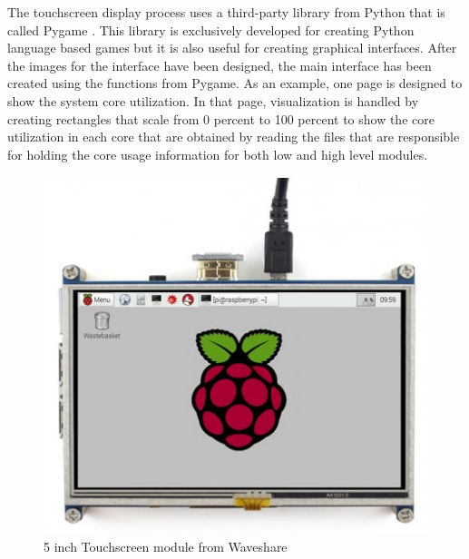 The touchscreen display process uses a third-party library from Python that is called Pygame \cite{pygame}. This library is exclusively developed for creating Python language based games but it is also useful for creating graphical interfaces. After the images for the interface have been designed, the main interface has been created using the functions from Pygame. As an example, one page is designed to show the system core utilization. In that page, visualization is handled by creating rectangles that scale from 0 percent to 100 percent to show the core utilization in each core that are obtained by reading the files that are responsible for holding the core usage information for both low and high level modules.
\begin{figure}[!ht]
	\centering
	\captionsetup{justification=centering}
	\includegraphics[scale=0.6]{content/images/touschreen5inc.jpg}
	\caption{5 inch Touchscreen module from Waveshare}
	\label{fig:touschreen5inc}
\end{figure}

